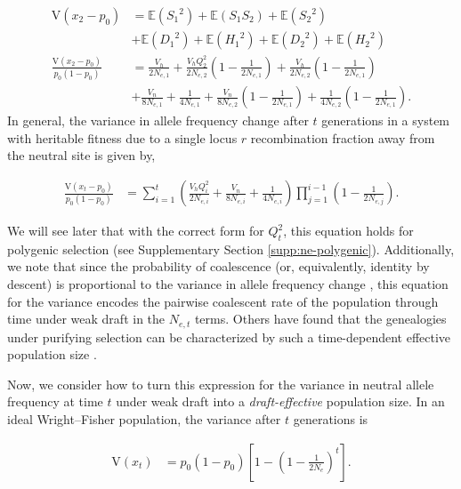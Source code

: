 \documentclass[11pt]{article}
\newcommand{\E}{\mathbb{E}}
\newcommand{\V}{\text{V}}
\newcommand{\V}{\text{V}}
\begin{document}
\begin{align}
    \label{eq:vardecay}
  \V(x_2 - p_0) &= \E({S_1}^2) + \E(S_1 S_2) + \E({S_2}^2) \nonumber \\
                  & + \E({D_1}^2) + \E({H_1}^2) + \E({D_2}^2) + \E({H_2}^2) \nonumber \\
  \frac{\V(x_2 - p_0)}{p_0(1-p_0)} &= \frac{V_h}{2N_{e,1}} + \frac{V_h Q_2^2}{2N_{e,2}}\left(1-\frac{1}{2N_{e,1}}\right)  +  \frac{V_h}{2N_{e,2}}  \left(1-\frac{1}{2N_{e,1}}\right)  \nonumber \\ 
                                     &+ \frac{V_n}{8N_{e,1}} + \frac{1}{4N_{e,1}} + \frac{V_n}{8N_{e,2}}  \left(1 - \frac{1}{2N_{e,1}}\right) 
+ \frac{1}{4N_{e,2}} \left(1 - \frac{1}{2N_{e,1}}\right).
\end{align}
%
In general, the variance in allele frequency change after $t$ generations in a
system with heritable fitness due to a single locus $r$ recombination fraction
away from the neutral site is given by,

\begin{align}
  \label{eqn:var_xt}
  \frac{\V(x_t - p_0)}{p_0(1-p_0)} &= \sum_{i=1}^t \left(\frac{V_h Q_i^2}{2 N_{e,i}} + \frac{V_n}{8N_{e,i}} + \frac{1}{4N_{e,i}} \right)\prod_{j=1}^{i-1} \left(1-\frac{1}{2 N_{e,j}}\right).
\end{align}

We will see later that with the correct form for $Q_t^2$, this equation holds
for polygenic selection (see Supplementary Section \ref{supp:ne-polygenic}).
Additionally, we note that since the probability of coalescence (or,
equivalently, identity by descent) is proportional to the variance in allele
frequency change \parencite{Barton2000-zg}, this equation for the variance
encodes the pairwise coalescent rate of the population through time under weak
draft in the $N_{e,t}$ terms. Others have found that the genealogies under
purifying selection can be characterized by such a time-dependent effective
population size \parencite{Nicolaisen2013-gv}.

Now, we consider how to turn this expression for the variance in neutral allele
frequency at time $t$ under weak draft into a \emph{draft-effective} population
size. In an ideal Wright--Fisher population, the variance after $t$ generations
is

\begin{align}
    \label{supp-eq:drift-vt}
    \V(x_t) &= p_0(1-p_0) \left[1 - \left(1 - \frac{1}{2N_e}\right)^t \right].
\end{align}
\end{document}
